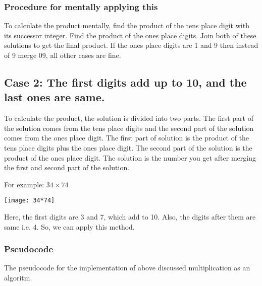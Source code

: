 \documentclass[12pt]{article}
\begin{document}
\subsubsection{Procedure for mentally applying this}
To calculate the product mentally, find the product of the tens place digit with its successor integer. Find the product of the ones place digits. Join both of these solutions to get the final product. If the ones place digits are 1 and 9 then instead of 9 merge 09, all other cases are fine.

\subsection{Case 2: The first digits add up to 10, and the last ones are same.}

To calculate the product, the solution is divided into two parts. The first part of the solution comes from the tens place digits and the second part of the solution comes from the ones place digit. The first part of solution is the product of the tens place digits plus the ones place digit. The second part of the solution is the product of the ones place digit. The solution is the number you get after merging the first and second part of the solution.~\cite{mul2}

\vspace{5mm}

\hspace{-17pt}For example: $34 \times 74$\newline
\begin{center}
\texttt{[image: 34*74]}\newline
\end{center}

\hspace{-17pt}Here, the first digits are 3 and 7, which add to 10. Also, the digits after them are same i.e. 4. So,
we can apply this method.



\subsubsection{Pseudocode}
The pseudocode for the implementation of above discussed multiplication as an algoritm.
\end{document}
